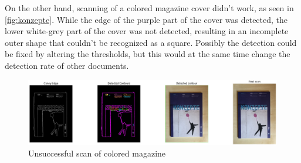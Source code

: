 On the other hand, scanning of a colored magazine cover didn't work, as seen in \autoref{fig:konzepte}. While the edge of the purple part of the cover was detected, the lower white-grey part of the cover was not detected, resulting in an incomplete outer shape that couldn't be recognized as a square. Possibly the detection could be fixed by altering the thresholds, but this would at the same time change the detection rate of other documents.

\begin{figure}[h]
    \includegraphics[width=1\textwidth]{figures/konzepte.jpg}
    \centering
    \caption{Unsuccessful scan of colored magazine}
    \label{fig:konzepte}
\end{figure}
